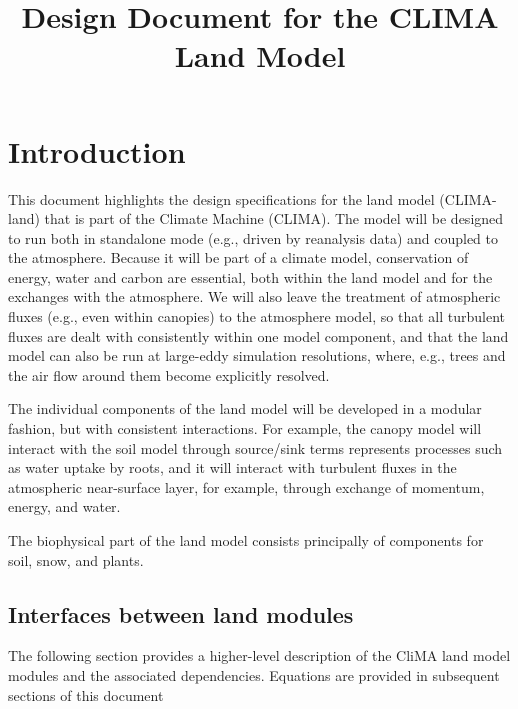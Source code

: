\documentclass{article}
\title{Design Document for the CLIMA Land Model}
\author{ }
\begin{document}
\maketitle
\tableofcontents

\section{Introduction}\label{s:introduction}

This document highlights the design specifications for the land model (CLIMA-land) that is part of the Climate Machine (CLIMA). The model will be designed to run both in standalone mode (e.g., driven by reanalysis data) and coupled to the atmosphere. Because it will be part of a climate model, conservation of energy, water and carbon are essential, both within the land model and for the exchanges with the atmosphere. We will also leave the treatment of atmospheric fluxes (e.g., even within canopies) to the atmosphere model, so that all turbulent fluxes are dealt with consistently within one model component, and that the land model can also be run at large-eddy simulation resolutions, where, e.g., trees and the air flow around them become explicitly resolved. 

The individual components of the land model will be developed in a modular fashion, but with consistent interactions. For example, the canopy model will interact with the soil model through source/sink terms represents processes such as water uptake by roots, and it will interact with turbulent fluxes in the atmospheric near-surface layer, for example, through exchange of momentum, energy, and water. 

The biophysical part of the land model consists principally of components for soil, snow, and plants.
\subsection{Interfaces between land modules}

The following section provides a higher-level description of the CliMA land model modules and the associated dependencies. Equations are provided in subsequent sections of this document
\end{document}
